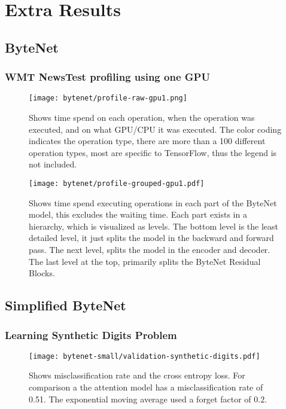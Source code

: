 \chapter{Extra Results}

\section{ByteNet}
\label{appendix:result:bytenet-profile}

\subsection{WMT NewsTest profiling using one GPU}
\begin{figure}[h]
    \centering
    \texttt{[image: bytenet/profile-raw-gpu1.png]}
    \caption{Shows time spend on each operation, when the operation was executed, and on what GPU/CPU it was executed. The color coding indicates the operation type, there are more than a 100 different operation types, most are specific to TensorFlow, thus the legend is not included.}
\end{figure}


\begin{figure}[h]
    \centering
    \texttt{[image: bytenet/profile-grouped-gpu1.pdf]}
    \caption{Shows time spend executing operations in each part of the ByteNet model, this excludes the waiting time. Each part exists in a hierarchy, which is visualized as levels. The bottom level is the least detailed level, it just splits the model in the backward and forward pass. The next level, splits the model in the encoder and decoder. The last level at the top, primarily splits the ByteNet Residual Blocks.}
\end{figure}

\clearpage

\section{Simplified ByteNet}
\label{appendix:result:bytenet-small}
\subsection{Learning Synthetic Digits Problem}
\begin{figure}[h]
    \centering
    \texttt{[image: bytenet-small/validation-synthetic-digits.pdf]}
    \caption{Shows misclassification rate and the cross entropy loss. For comparison a the attention model has a misclassification rate of 0.51. The exponential moving average used a forget factor of $0.2$.}
\end{figure}
\clearpage

